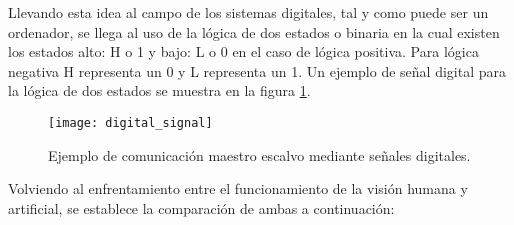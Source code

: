 \begin{itemize}
Llevando esta idea al campo de los sistemas digitales, tal y como puede ser un ordenador, se llega al uso de la lógica de dos estados o binaria en la cual existen los estados alto: H o 1 y bajo: L o 0 en el caso de lógica positiva. Para lógica negativa  H representa un 0 y L representa un 1.
Un ejemplo de señal digital para la lógica de dos estados se muestra en la figura \ref{fig:digital_signal}.

\begin{figure}[!htb]
\centering
{}
  \texttt{[image: digital\_signal]}
  \caption{Ejemplo de comunicación maestro escalvo mediante señales digitales.}\label{fig:digital_signal}
\endminipage\hfill
\end{figure}

\end{itemize}

Volviendo al enfrentamiento entre el funcionamiento de la visión humana y artificial, se establece la comparación de ambas a continuación:

